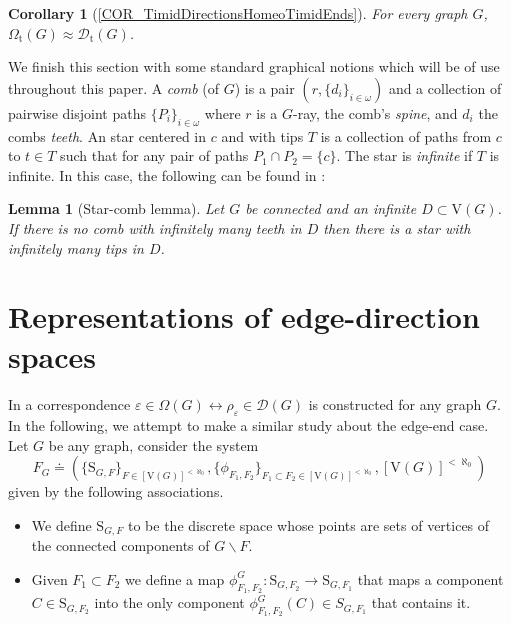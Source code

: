 \documentclass[10pt]{article}
\numberwithin{equation}{subsection}
\newtheorem{lemma}[equation]{Lemma}
\newtheorem*{corollary*}{Corollary}
\theoremstyle{remark}
\begin{document}
\begin{corollary*}[\ref{COR_TimidDirectionsHomeoTimidEnds}]
    For every graph $G$, $\Omega_{\mathrm{t}}(G)\approx  \mathcal{D}_{\mathrm{t}}(G)$.
\end{corollary*}

We finish this section with some standard graphical notions which will be of use throughout this paper. A \emph{comb} (of $G$) is a pair $(r,\{d_i\}_{i \in \omega})$ and a collection of pairwise disjoint paths $\{P_i\}_{i \in \omega}$ where $r$ is a $G$-ray, the comb's \emph{spine}, and $d_i$ the combs \emph{teeth}. An star centered in $c$ and with tips $T$ is a collection of paths from $c$ to $t \in T$ such that for any pair of paths $P_1\cap P_2 = \{c\}$. The star is \emph{infinite} if $T$ is infinite. In this case, the following can be found in \cite{diestelgraphtheory}:

\begin{lemma}[Star-comb lemma]
\label{starcomb}
    Let $ G $ be connected and an infinite $ D \subset \mathrm{V}(G) $. If there is no comb with infinitely many teeth in $D$ then there is a star with infinitely many tips in $ D $.
\end{lemma}

    \section{Representations of edge-direction spaces}

\paragraph{}
In \cite{DIESTEL2003197} a correspondence $\varepsilon \in \Omega(G) \leftrightarrow \rho_\varepsilon \in \mathcal{D}(G)$ is constructed for any graph $G$. In the following, we attempt to make a similar study about the edge-end case. Let $G$ be any graph, consider the system \[ F_G \doteq \left( \{\mathrm{S}_{G,F}\}_{F \in [\mathrm{V}(G)]^{<\aleph_0}},\{\phi_{F_1,F_2}\}_{F_1 \subset F_2 \in [\mathrm{V}(G)]^{<\aleph_0}}, [\mathrm{V}(G)]^{<\aleph_0}\right)\] given by the following associations. 

\begin{itemize}
    \item We define $\mathrm{S}_{G,F}$ to be the discrete space whose points are sets of vertices of the connected components of $G \backslash F$. 
    \item Given $F_1 \subset F_2$ we define a map $ \phi_{F_1,F_2}^G: \mathrm{S}_{G,F_2} \to \mathrm{S}_{G,F_1} $ that maps a component $C \in \mathrm{S}_{G,F_2}$ into the only component $\phi_{F_1,F_2}^G(C) \in S_{G,F_1}$ that contains it.
\end{itemize}  
\end{document}
